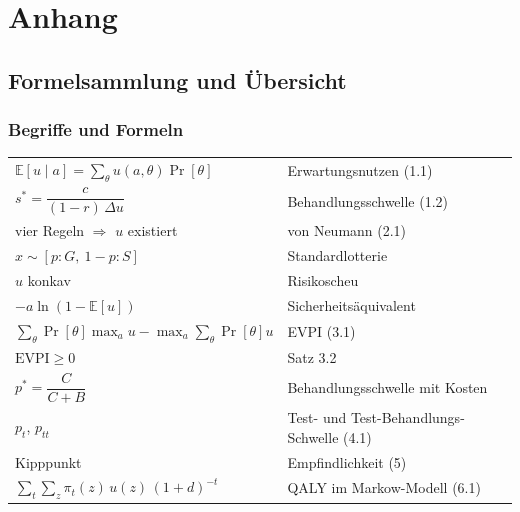 \appendix
\part{Anhang}

\newcommand{\lit}[3]{\vspace{5pt}\noindent\textbf{[#1]} #2\par\nopagebreak\vspace{1pt}{\small\itshape\color{grau} #3}\par\vspace{2pt}}

\chapter{Formelsammlung und Übersicht}

\section{Begriffe und Formeln}

\begin{merksatz}
\begin{center}
{\small
\renewcommand{\arraystretch}{1.6}
\begin{tabular}{@{}P{4.4cm}P{4.2cm}@{}}
\toprule
$\mathbb{E}[u\mid a] = \sum_\theta u(a,\theta)\Pr[\theta]$ & Erwartungsnutzen (1.1)\\
$s^{*} = \dfrac{c}{(1-r)\,\Delta u}$ & Behandlungsschwelle (1.2)\\
vier Regeln $\Rightarrow$ $u$ existiert & von Neumann (2.1)\\
$x \sim [p:G,\ 1-p:S]$ & Standardlotterie\\
$u$ konkav & Risikoscheu\\
$-a\ln(1-\mathbb{E}[u])$ & Sicherheitsäquivalent\\
$\sum_\theta \Pr[\theta]\max_a u - \max_a \sum_\theta \Pr[\theta]u$ & EVPI (3.1)\\
$\text{EVPI} \ge 0$ & Satz 3.2\\
$p^{*} = \dfrac{C}{C+B}$ & Behandlungsschwelle mit Kosten\\
$p_t$, $p_{tt}$ & Test- und Test-Behandlungs-Schwelle (4.1)\\
Kipppunkt & Empfindlichkeit (5)\\
$\sum_t \sum_z \pi_t(z)\,u(z)\,(1+d)^{-t}$ & QALY im Markow-Modell (6.1)\\
\bottomrule
\end{tabular}}
\end{center}
\end{merksatz}

